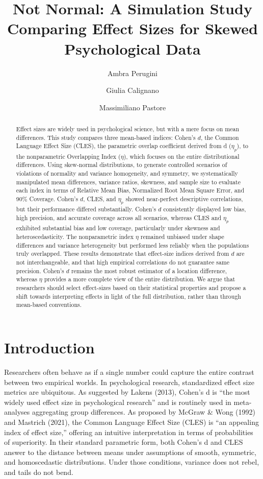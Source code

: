\documentclass[
  12pt,
  a4paper,
  DIV=11,
  numbers=noendperiod]{scrartcl}
\title{Not Normal: A Simulation Study Comparing Effect Sizes for Skewed
Psychological Data}
\author{Ambra Perugini \and Giulia Calignano \and Massimiliano Pastore}
\date{}
\begin{document}
\maketitle
\begin{abstract}
Effect sizes are widely used in psychological science, but with a mere
focus on mean differences. This study compares three mean-based indices:
Cohen's \(d\), the Common Language Effect Size (CLES), the parametric
overlap coefficient derived from d (\(\eta_p\)), to the nonparametric
Overlapping Index (\(\eta\)), which focuses on the entire distributional
differences. Using skew-normal distributions, to generate controlled
scenarios of violations of normality and variance homogeneity, and
symmetry, we systematically manipulated mean differences, variance
ratios, skewness, and sample size to evaluate each index in terms of
Relative Mean Bias, Normalized Root Mean Square Error, and 90\%
Coverage. Cohen's \(d\), CLES, and \(\eta_p\) showed near-perfect
descriptive correlations, but their performance differed substantially.
Cohen's \(d\) consistently displayed low bias, high precision, and
accurate coverage across all scenarios, whereas CLES and \(\eta_p\)
exhibited substantial bias and low coverage, particularly under skewness
and heteroscedasticity. The nonparametric index \(\eta\) remained
unbiased under shape differences and variance heterogeneity but
performed less reliably when the populations truly overlapped. These
results demonstrate that effect-size indices derived from \(d\) are not
interchangeable, and that high empirical correlations do not guarantee
same precision. Cohen's \(d\) remains the most robust estimator of a
location difference, whereas \(\eta\) provides a more complete view of
the entire distribution. We argue that researchers should select
effect-sizes based on their statistical properties and propose a shift
towards interpreting effects in light of the full distribution, rather
than through mean-based conventions.
\end{abstract}


\section{Introduction}\label{introduction}

Researchers often behave as if a single number could capture the entire
contrast between two empirical worlds. In psychological research,
standardized effect size metrics are ubiquitous. As suggested by Lakens
(2013), Cohen's d is ``the most widely used effect size in psychological
research'' and is routinely used in meta-analyses aggregating group
differences. As proposed by McGraw \& Wong (1992) and Mastrich (2021),
the Common Language Effect Size (CLES) is ``an appealing index of effect
size,'' offering an intuitive interpretation in terms of probabilities
of superiority. In their standard parametric form, both Cohen's d and
CLES answer to the distance between means under assumptions of smooth,
symmetric, and homoscedastic distributions. Under those conditions,
variance does not rebel, and tails do not bend.
\end{document}
